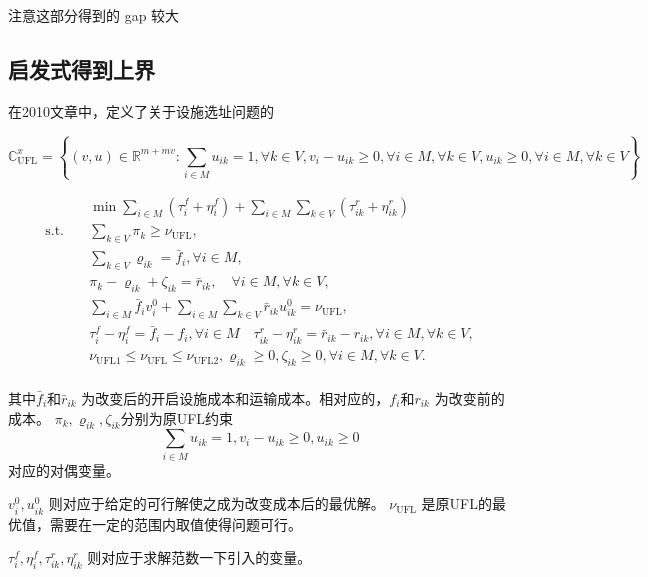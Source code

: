 \documentclass[UTF8]{article}
\begin{document}
注意这部分得到的 gap 较大

\subsection{启发式得到上界}

在2010文章中，定义了关于设施选址问题的

\[
\mathbb{C}_{\mathrm{UFL}}^{x}=\left\{(v, u) \in \mathbb{R}^{m+m v}: \sum_{i \in M} u_{i k}=1, \forall k \in V, v_{i}-u_{i k} \geq 0, \forall i \in M, \forall k \in V, u_{i k} \geq 0, \forall i \in M, \forall k \in V\right\}
\]


\begin{equation}
\begin{aligned}
&\min \sum_{i \in M} \left(\tau_{i}^{f}+\eta_{i}^{f}\right)+\sum_{i \in M} \sum_{k \in V} \left(\tau_{i k}^r+\eta_{i k}^{r}\right) \\
\text{s.t.} \quad &\sum_{k \in V} \pi_{k} \geq \nu_{\mathrm{UFL}}, \\
&\sum_{k \in V} \varrho_{i k}=\bar{f}_{i}, \forall i \in M, \\
&\pi_{k}-\varrho_{i k}+\zeta_{i k}=\bar{r}_{i k}, \quad \forall i \in M, \forall k \in V, \\
&\sum_{i \in M} \bar{f}_{i} v_{i}^{0}+\sum_{i \in M} \sum_{k \in V} \bar{r}_{i k} u_{i k}^{0}=\nu_{\mathrm{UFL}}, \\
& \tau_{i}^{f}-\eta_{i}^{f}=\bar{f}_{i}-f_{i}, \forall i \in M \quad \tau_{i k}^{r}-\eta_{i k}^{r}=\bar{r}_{i k}-r_{i k}, \forall i \in M, \forall k \in V, \\
&\nu_{\mathrm{UFL} 1} \leq \nu_{\mathrm{UFL}} \leq \nu_{\mathrm{UFL} 2}, \varrho_{i k} \geq 0, \zeta_{i k} \geq 0, \forall i \in M, \forall k \in V. \\
\end{aligned}
\end{equation}

其中$\bar{f}_{i}$和$\bar{r}_{ik}$ 为改变后的开启设施成本和运输成本。相对应的，$f_{i}$和$r_{ik}$ 为改变前的成本。
$\pi_{k},\varrho_{i k},\zeta_{i k}$分别为原UFL约束
\begin{equation*}
\sum_{i \in M} u_{ik} = 1,
v_i - u_{ik} \geq 0,
u_{ik} \geq 0
\end{equation*}
对应的对偶变量。 \par
$v_{i}^{0},u_{i k}^{0}$ 则对应于给定的可行解使之成为改变成本后的最优解。
$\nu_{\mathrm{UFL}}$ 是原UFL的最优值，需要在一定的范围内取值使得问题可行。

$\tau_{i}^{f},\eta_{i}^{f},\tau_{i k}^r,\eta_{i k}^{r}$ 则对应于求解范数一下引入的变量。 \par
\end{document}

